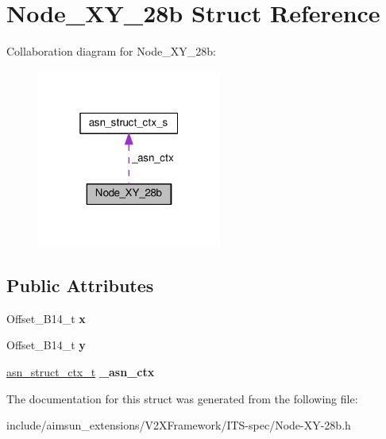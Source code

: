 \hypertarget{structNode__XY__28b}{}\section{Node\+\_\+\+X\+Y\+\_\+28b Struct Reference}
\label{structNode__XY__28b}


Collaboration diagram for Node\+\_\+\+X\+Y\+\_\+28b\+:\nopagebreak
\begin{figure}[H]
\begin{center}
\leavevmode
\includegraphics[width=172pt]{structNode__XY__28b__coll__graph}
\end{center}
\end{figure}
\subsection*{Public Attributes}
\begin{DoxyCompactItemize}
\item 
Offset\+\_\+\+B14\+\_\+t {\bfseries x}\hypertarget{structNode__XY__28b_a99fbb06c0306a537f74abbc1c42d2387}{}\label{structNode__XY__28b_a99fbb06c0306a537f74abbc1c42d2387}

\item 
Offset\+\_\+\+B14\+\_\+t {\bfseries y}\hypertarget{structNode__XY__28b_a107bfa6636634239af2da6210235ffd6}{}\label{structNode__XY__28b_a107bfa6636634239af2da6210235ffd6}

\item 
\hyperlink{structasn__struct__ctx__s}{asn\+\_\+struct\+\_\+ctx\+\_\+t} {\bfseries \+\_\+asn\+\_\+ctx}\hypertarget{structNode__XY__28b_ab7736517972bfc899c20b0c1a3989ab0}{}\label{structNode__XY__28b_ab7736517972bfc899c20b0c1a3989ab0}

\end{DoxyCompactItemize}


The documentation for this struct was generated from the following file\+:\begin{DoxyCompactItemize}
\item 
include/aimsun\+\_\+extensions/\+V2\+X\+Framework/\+I\+T\+S-\/spec/Node-\/\+X\+Y-\/28b.\+h\end{DoxyCompactItemize}
